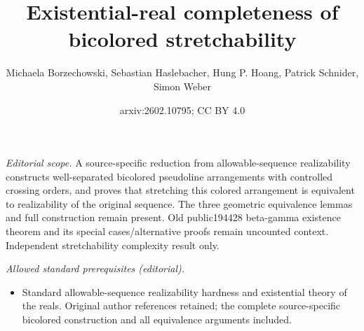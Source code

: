 \documentclass[11pt]{article}
\title{Existential-real completeness of bicolored stretchability}
\author{Michaela Borzechowski, Sebastian Haslebacher, Hung P. Hoang, Patrick Schnider, Simon Weber}
\date{arxiv:2602.10795; CC BY 4.0}
\begin{document}
\maketitle
\noindent\textit{Editorial scope.} A source-specific reduction from allowable-sequence realizability constructs well-separated bicolored pseudoline arrangements with controlled crossing orders, and proves that stretching this colored arrangement is equivalent to realizability of the original sequence. The three geometric equivalence lemmas and full construction remain present. Old public194428 beta-gamma existence theorem and its special cases/alternative proofs remain uncounted context. Independent stretchability complexity result only.\par\medskip
\noindent\textit{Allowed standard prerequisites (editorial).}\begin{itemize}
\item Standard allowable-sequence realizability hardness and existential theory of the reals. Original author references retained; the complete source-specific bicolored construction and all equivalence arguments included.
\end{itemize}\medskip
\end{document}
